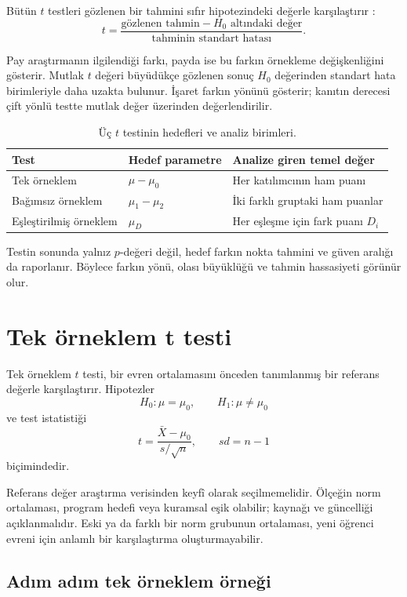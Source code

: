 Bütün $t$ testleri gözlenen bir tahmini sıfır hipotezindeki değerle
karşılaştırır \cite{casella2002,wasserman2004}:
\[
t=\frac{\text{gözlenen tahmin}-\text{$H_0$ altındaki değer}}
        {\text{tahminin standart hatası}}.
\]

Pay araştırmanın ilgilendiği farkı, payda ise bu farkın örnekleme
değişkenliğini gösterir. Mutlak $t$ değeri büyüdükçe gözlenen sonuç $H_0$
değerinden standart hata birimleriyle daha uzakta bulunur. İşaret farkın
yönünü gösterir; kanıtın derecesi çift yönlü testte mutlak değer üzerinden
değerlendirilir.

\begin{table}[htbp]
\centering
\caption{Üç $t$ testinin hedefleri ve analiz birimleri.}
\begin{tabular}{@{}p{}p{}p{}@{}}
\toprule
Test & Hedef parametre & Analize giren temel değer \\
\midrule
Tek örneklem & $\mu-\mu_0$ & Her katılımcının ham puanı \\
Bağımsız örneklem & $\mu_1-\mu_2$ & İki farklı gruptaki ham puanlar \\
Eşleştirilmiş örneklem & $\mu_D$ & Her eşleşme için fark puanı $D_i$ \\
\bottomrule
\end{tabular}
\end{table}

Testin sonunda yalnız $p$-değeri değil, hedef farkın nokta tahmini ve güven
aralığı da raporlanır. Böylece farkın yönü, olası büyüklüğü ve tahmin
hassasiyeti görünür olur.

\section{Tek örneklem t testi}

Tek örneklem $t$ testi, bir evren ortalamasını önceden tanımlanmış bir referans
değerle karşılaştırır. Hipotezler
\[
H_0:\mu=\mu_0,
\qquad
H_1:\mu\neq\mu_0
\]
ve test istatistiği
\[
t=\frac{\bar X-\mu_0}{s/\sqrt n},
\qquad sd=n-1
\]
biçimindedir.

Referans değer araştırma verisinden keyfî olarak seçilmemelidir. Ölçeğin norm
ortalaması, program hedefi veya kuramsal eşik olabilir; kaynağı ve güncelliği
açıklanmalıdır. Eski ya da farklı bir norm grubunun ortalaması, yeni öğrenci
evreni için anlamlı bir karşılaştırma oluşturmayabilir.

\subsection{Adım adım tek örneklem örneği}


